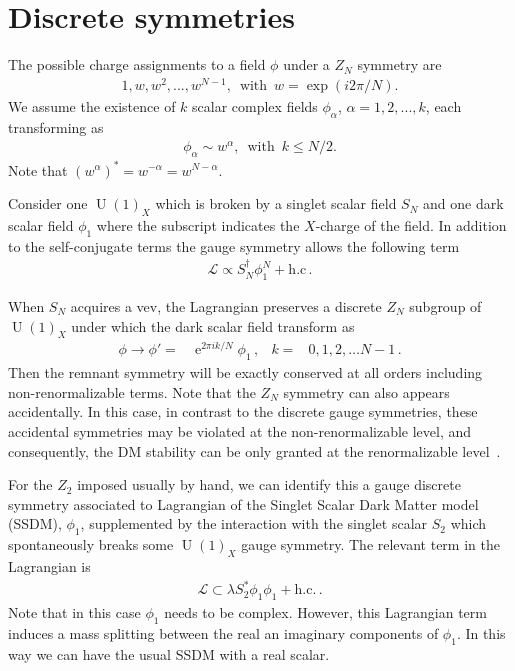 \documentclass[prd,amsfonts,aps,nofootinbib,notitlepage,11pt,superscriptaddress]{revtex4-1}
\begin{document}
\section{Discrete symmetries}

The possible charge assignments to a field $\phi$ under a $Z_N$ symmetry are
\begin{align}
    1,w, w^2, ...,w^{N-1}, \,\,\,\text{with}\,\,\,w=\exp(i2\pi/N). 
\end{align}
We assume the existence of $k$ scalar complex fields $\phi_\alpha$, $\alpha=1,2,...,k$, each transforming as
\begin{align}
    \phi_\alpha\sim w^\alpha,  \,\,\,\text{with}\,\,\,k\leq N/2.
\end{align}
Note that $(w^\alpha)^*=w^{-\alpha}=w^{N-\alpha}$. 

Consider one $\operatorname{U}(1)_X$ which is broken by a singlet scalar field $S_N$ and one dark scalar field $\phi_1$ where the subscript indicates the $X$-charge of the field. In addition to the self-conjugate terms the gauge symmetry allows the following term~\cite{Batell:2010bp}
\begin{align}
  \mathcal{L}\varpropto S_N^{\dagger}\phi_1^N + \text{h.c}\,.
\end{align}

When $S_N$ acquires a vev, the Lagrangian preserves a discrete $Z_N$ subgroup of $\operatorname{U}(1)_X$ under which the dark scalar field transform as
\begin{align}
  \phi\to \phi' = &\operatorname{e}^{2\pi i k/N} \phi_1\,,& k=&0,1,2,\ldots N-1\,.
\end{align}
Then the remnant symmetry will be exactly conserved at all orders
including non-renormalizable terms.  Note that the $Z_N$ symmetry can
also appears accidentally. In this case, in contrast to the discrete
gauge symmetries, these accidental symmetries may be violated at the
non-renormalizable level, and consequently, the DM stability can be
only granted at the renormalizable level~\cite{Batell:2010bp}.

For the $Z_2$ imposed usually by hand, we can identify this a gauge discrete symmetry associated to Lagrangian of the Singlet Scalar Dark Matter model (SSDM), $\phi_1$, supplemented by the interaction with the singlet scalar $S_2$ which spontaneously breaks some $\operatorname{U}(1)_X$ gauge symmetry. The relevant term in the Lagrangian is
\begin{align}
  \mathcal{L}\subset \lambda S_2^{*} \phi_1 \phi_1+ \text{h.c.}\,.
\end{align}
Note that in this case $\phi_1$  needs to be complex. However, this Lagrangian term induces a mass splitting between the real an imaginary components of $\phi_1$. In this way we can have the usual SSDM with a real scalar.
\end{document}
